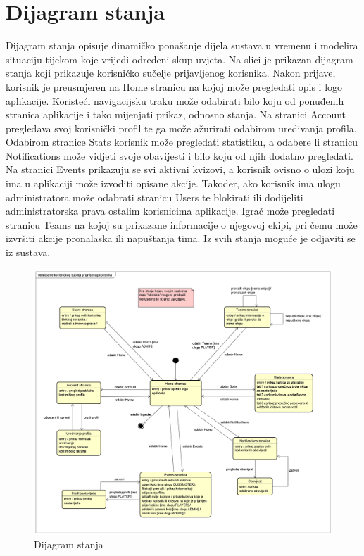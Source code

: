 			\eject
		
		\section{Dijagram stanja}
		
		
		Dijagram stanja opisuje dinamičko ponašanje dijela sustava u vremenu i  modelira situaciju tijekom koje vrijedi određeni skup uvjeta. Na slici je prikazan dijagram stanja koji prikazuje korisničko sučelje prijavljenog korisnika. Nakon prijave, korisnik je preusmjeren na Home stranicu na kojoj može pregledati opis i logo aplikacije. Koristeći navigacijsku traku može odabirati bilo koju od ponuđenih stranica aplikacije i tako mijenjati prikaz, odnosno stanja. Na stranici Account pregledava svoj korisnički profil te ga može ažurirati odabirom uređivanja profila. Odabirom stranice Stats korisnik može pregledati statistiku, a odabere li stranicu Notifications može vidjeti svoje obavijesti i bilo koju od njih dodatno pregledati. Na stranici Events prikazuju se svi aktivni kvizovi, a korisnik ovisno o ulozi koju ima u aplikaciji može izvoditi opisane akcije. Također, ako korisnik ima ulogu administratora može odabrati stranicu Users te blokirati ili dodijeliti administratorska prava ostalim korisnicima aplikacije. Igrač može pregledati stranicu Teams na kojoj su prikazane informacije o njegovoj ekipi, pri čemu može izvršiti akcije pronalaska ili napuštanja tima. Iz svih stanja moguće je odjaviti se iz sustava. 
		
		
		\begin{figure}[H]
			\includegraphics[width=\textwidth]{dijagrami/StatemachineDiagram.PNG} 
			\caption{Dijagram stanja}
			\label{fig:StatemachineDiagram}
		\end{figure}
		
